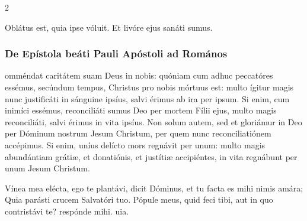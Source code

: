 \documentclass[9pt,twoside]{extarticle}
\begin{document}
\begin{multicols}{2}
%
%
%
%
%
%
%
%
%
%
%
%

\begin{tightlist}{}
\item {} Oblátus est, quia ipse vóluit.  Et livóre ejus sanáti sumus.
\end{tightlist}

\subsubsection*{\center De Epístola beáti Pauli Apóstoli ad Romános}
\begin{center}\end{center}
omméndat caritátem suam Deus in nobis: quóniam cum adhuc peccatóres essémus, secúndum tempus, Christus pro nobis mórtuus est: multo ígitur magis nunc justificáti in sánguine ipsíus, salvi érimus ab ira per ipsum. Si enim, cum inimíci essémus, reconciliáti sumus Deo per mortem Fílii ejus, multo magis reconciliáti, salvi érimus in vita ipsíus. Non solum autem, sed et gloriámur in Deo per Dóminum nostrum Jesum Christum, per quem nunc reconciliatiónem accépimus. Si enim, uníus delícto mors regnávit per unum: multo magis abundántiam grátiæ, et donatiónis, et justítiæ accipiéntes, in vita regnábunt per unum Jesum Christum.

\begin{tightlist}{}
\item {} Vínea mea elécta, ego te plantávi, dicit Dóminus, et tu facta es mihi nimis amára; \textred{*} Quia parásti crucem Salvatóri tuo.  Pópule meus, quid feci tibi, aut in quo contristávi te? respónde mihi. uia.
\end{tightlist}


\end{multicols}
\end{document}
